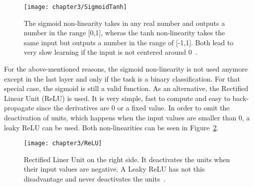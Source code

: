\begin{figure}[!h]
  \centering
  \caption{The sigmoid non-linearity takes in any real number and outputs a number in the range [0,1], wheras the tanh non-linearity takes the same input but outputs a number in the range of [-1,1]. Both lead to very slow learning if the input is not centered around 0~\cite{cs231neuralnetworks}.}
  \texttt{[image: chapter3/SigmoidTanh]}
  \label{fig:SigmoidTanh}
\end{figure}

\quad

For the above-mentioned reasons, the sigmoid non-linearity is not used anymore except in the last layer and only if the task is a binary classification. For that special case, the sigmoid is still a valid function. As an alternative, the Rectified Linear Unit (ReLU) is used. It is very simple, fast to compute and easy to back-propagate since the derivatives are 0 or a fixed value. In order to omit the deactivation of units, which happens when the input values are smaller than 0, a leaky ReLU can be used. Both non-linearities can be seen in Figure~\ref{fig:ReLU}.\\


\begin{figure}[!h]
  \centering
  \caption{Rectified Liner Unit on the right side. It deactivates the units when their input values are negative. A Leaky ReLU has not this disadvantage and never deactivates the units~\cite{reinventingNN}.}
  \texttt{[image: chapter3/ReLU]}
  \label{fig:ReLU}
\end{figure}

\quad

